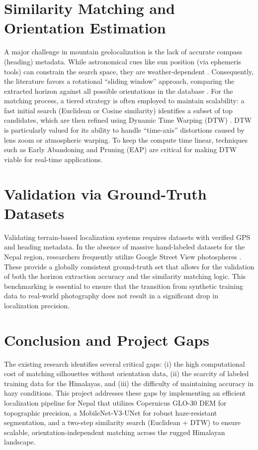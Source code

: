 \section{Similarity Matching and Orientation Estimation}
A major challenge in mountain geolocalization is the lack of accurate compass (heading) metadata. While astronomical cues like sun position (via ephemeris tools) can constrain the search space, they are weather-dependent \cite{baatz2012large, chen2015camera}. Consequently, the literature favors a rotational ``sliding window'' approach, comparing the extracted horizon against all possible orientations in the database \cite{chen2015camera}. For the matching process, a tiered strategy is often employed to maintain scalability: a fast initial search (Euclidean or Cosine similarity) identifies a subset of top candidates, which are then refined using Dynamic Time Warping (DTW) \cite{rourera2022skyline}. DTW is particularly valued for its ability to handle ``time-axis'' distortions caused by lens zoom or atmospheric warping. To keep the compute time linear, techniques such as Early Abandoning and Pruning (EAP) are critical for making DTW viable for real-time applications.

\section{Validation via Ground-Truth Datasets}
Validating terrain-based localization systems requires datasets with verified GPS and heading metadata. In the absence of massive hand-labeled datasets for the Nepal region, researchers frequently utilize Google Street View photospheres \cite{baatz2012large}. These provide a globally consistent ground-truth set that allows for the validation of both the horizon extraction accuracy and the similarity matching logic. This benchmarking is essential to ensure that the transition from synthetic training data to real-world photography does not result in a significant drop in localization precision.

\section{Conclusion and Project Gaps}
The existing research identifies several critical gaps: (i) the high computational cost of matching silhouettes without orientation data, (ii) the scarcity of labeled training data for the Himalayas, and (iii) the difficulty of maintaining accuracy in hazy conditions. This project addresses these gaps by implementing an efficient localization pipeline for Nepal that utilizes Copernicus GLO-30 DEM for topographic precision, a MobileNet-V3-UNet for robust haze-resistant segmentation, and a two-step similarity search (Euclidean + DTW) to ensure scalable, orientation-independent matching across the rugged Himalayan landscape.

